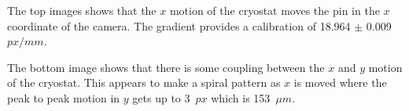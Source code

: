 \documentclass[a4paper,12pt]{article}
\begin{document}
The top images shows that the $x$ motion of the cryostat moves the pin in the $x$ coordinate of the camera. The gradient provides a calibration of 18.964 $\pm$ 0.009~$px/mm$.

The bottom image shows that there is some coupling between the $x$ and $y$ motion of the cryostat. This appears to make a spiral pattern as $x$ is moved where the peak to peak motion in $y$ gets up to 3~$px$ which is 153~$\mu m$.




\end{document}
